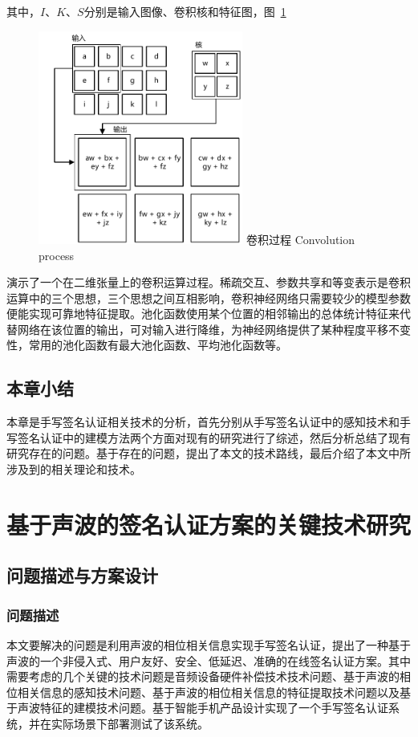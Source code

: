 其中，$I$、$K$、$S$分别是输入图像、卷积核和特征图，图~\ref{fig:convolution-process}
\begin{figure}[!htp]
  \centering
  \includegraphics[width=0.6\textwidth]{figure/convolution-process.pdf}
  \bicaption
    {卷积过程}
    {Convolution process}
  \label{fig:convolution-process}
\end{figure}
演示了一个在二维张量上的卷积运算过程。稀疏交互、参数共享和等变表示是卷积运算中的三个思想，三个思想之间互相影响，卷积神经网络只需要较少的模型参数便能实现可靠地特征提取。池化函数使用某个位置的相邻输出的总体统计特征来代替网络在该位置的输出，可对输入进行降维，为神经网络提供了某种程度平移不变性，常用的池化函数有最大池化函数、平均池化函数等。


\section{本章小结}
本章是手写签名认证相关技术的分析，首先分别从手写签名认证中的感知技术和手写签名认证中的建模方法两个方面对现有的研究进行了综述，然后分析总结了现有研究存在的问题。基于存在的问题，提出了本文的技术路线，最后介绍了本文中所涉及到的相关理论和技术。

\chapter{基于声波的签名认证方案的关键技术研究}
\section{问题描述与方案设计}
\subsection{问题描述}
本文要解决的问题是利用声波的相位相关信息实现手写签名认证，提出了一种基于声波的一个非侵入式、用户友好、安全、低延迟、准确的在线签名认证方案。其中需要考虑的几个关键的技术问题是音频设备硬件补偿技术技术问题、基于声波的相位相关信息的感知技术问题、基于声波的相位相关信息的特征提取技术问题以及基于声波特征的建模技术问题。基于智能手机产品设计实现了一个手写签名认证系统，并在实际场景下部署测试了该系统。


